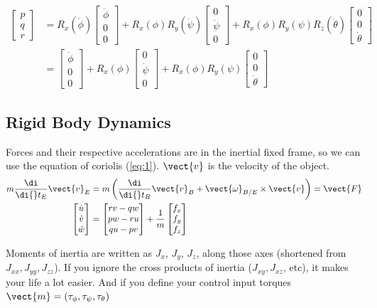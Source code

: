 \documentclass{report}
\newcommand{\diff}[1]{\frac{\di}{\di{}t_{#1}}}
\newcommand{\cvec}[1]{\begin{bmatrix}
    #1
\end{bmatrix}}
\begin{document}
\begin{equation}
    \begin{split}
        \cvec{p\\q\\r} &= R_x(\dot\phi)\cvec{\dot\phi\\0\\0} 
        + R_x(\phi)R_y(\dot\psi)\cvec{0\\\dot\psi\\0}
        + R_x(\phi)R_y(\psi)R_z(\dot\theta)\cvec{0\\0\\\dot\theta}\\
        &=\cvec{\dot\phi\\0\\0} 
        + R_x(\phi)\cvec{0\\\dot\psi\\0}
        + R_x(\phi)R_y(\psi)\cvec{0\\0\\\dot\theta}
    \end{split}
\end{equation}
\subsection{Rigid Body Dynamics}
Forces and their respective accelerations are in the inertial fixed frame, so we can use the equation of coriolis (\ref{eq:1}). $\vect{v}$ is the velocity of the object. 
\begin{equation}
    \begin{split}
        m\diff{E}\vect{v}_E &=m\left(\diff{B}\vect{v}_B + \vect{\omega}_{B/E} \times \vect{v} \right) = \vect{F} \\
        \cvec{\dot u \\ \dot v \\ \dot w} &= \cvec{rv-qw \\ pw-ru \\ qu - pv} + \frac{1}{m} \cvec{f_x \\ f_y \\ f_z}
    \end{split}
\end{equation}

Moments of inertia are written as $J_x$, $J_y$, $J_z$, along those axes (shortened from $J_{xx}, J_{yy}, J_{zz}$). If you ignore the cross products of inertia ($J_{xy}, J_{xz}$, etc), it makes your life a lot easier. And if you define your control input torques $\vect{m} = \left(\tau_{\phi}, \tau_{\psi}, \tau_{\theta} \right)$
\end{document}
